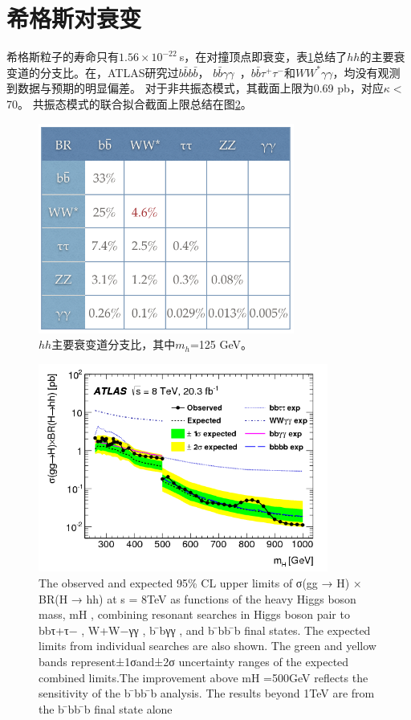 \section{希格斯对衰变}
希格斯粒子的寿命只有$1.56\times10^{-22}~$s，在对撞顶点即衰变，表\ref{fig:HH_br}总结了$hh$的主要衰变道的分支比。在\RunOne ，ATLAS研究过$b\bar{b}b\bar{b}$\cite{Aad:2015uka}，
$b\bar{b}\gamma\gamma$~\cite{Aad:2014yja}，$b\bar{b}\tau^{+}\tau^{-}$和$WW^{*}\gamma\gamma$，均没有观测到数据与预期的明显偏差。
对于非共振态模式，其截面上限为0.69 pb，对应$\kappa<$70。
共振态模式的联合拟合截面上限总结在图\ref{fig:HH_run1_combined}。
\begin{figure}[h]
\centering
 \includegraphics[width=0.75\textwidth]{fig/HH_br.png}
  \caption{$hh$主要衰变道分支比，其中$m_h$=125 GeV。}
  \label{fig:HH_br}
\end{figure}

\begin{figure}[h]
\centering
 \includegraphics[width=0.85\textwidth]{fig/HH_run1_combined.png}
\caption{The observed and expected 95\% CL upper limits of σ(gg → H) × BR(H → hh) at s = 8TeV as functions of the heavy Higgs boson mass, mH , combining resonant searches in Higgs boson pair to bbτ+τ− , W+W−γγ , b ̄bγγ , and b ̄bb ̄b final states. The expected limits from individual searches are also shown. The green and yellow bands represent±1σand±2σ uncertainty ranges of the expected combined limits.The improvement above mH =500GeV reflects the sensitivity of the b ̄bb ̄b analysis. The results beyond 1TeV are from the b ̄bb ̄b final state alone}
\label{fig:HH_run1_combined}
\end{figure}

